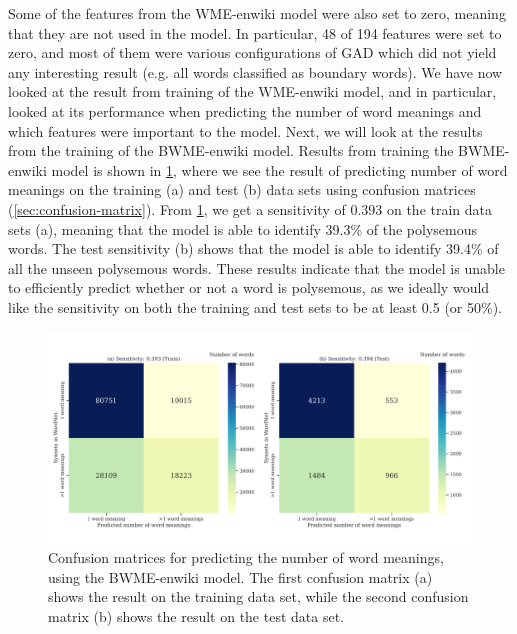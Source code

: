 Some of the features from the WME-enwiki model were also set to zero, meaning that they are not used in the model. In particular, 48 of 194 features were set to zero, and most of them were various configurations of GAD which did not yield any interesting result (e.g. all words classified as boundary words). We have now looked at the result from training of the WME-enwiki model, and in particular, looked at its performance when predicting the number of word meanings and which features were important to the model. Next, we will look at the results from the training of the BWME-enwiki model. Results from training the BWME-enwiki model is shown in \cref{fig:bwme-enwiki-confusion-matrices}, where we see the result of predicting number of word meanings on the training (a) and test (b) data sets using confusion matrices (\cref{sec:confusion-matrix}). From \cref{fig:bwme-enwiki-confusion-matrices}, we get a sensitivity of 0.393 on the train data sets (a), meaning that the model is able to identify 39.3\% of the polysemous words. The test sensitivity (b) shows that the model is able to identify 39.4\% of all the unseen polysemous words. These results indicate that the model is unable to efficiently predict whether or not a word is polysemous, as we ideally would like the sensitivity on both the training and test sets to be at least 0.5 (or 50\%).
\begin{figure}[H]
    \centering
    \includegraphics[width=\textwidth]{thesis/figures/bwme-enwiki-confusion-matrices.pdf}
    \caption{Confusion matrices for predicting the number of word meanings, using the BWME-enwiki model. The first confusion matrix (a) shows the result on the training data set, while the second confusion matrix (b) shows the result on the test data set.}
    \label{fig:bwme-enwiki-confusion-matrices}
\end{figure}

